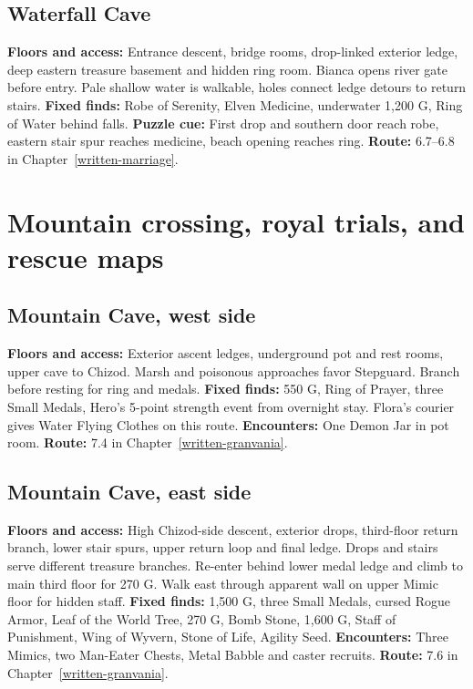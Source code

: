 \subsection{Waterfall Cave}
\label{atlas-waterfall}
\textbf{Floors and access:} Entrance descent, bridge rooms, drop-linked exterior ledge, deep eastern treasure basement and hidden ring room. Bianca opens river gate before entry. Pale shallow water is walkable, holes connect ledge detours to return stairs. \textbf{Fixed finds:} Robe of Serenity, Elven Medicine, underwater 1,200 G, Ring of Water behind falls. \textbf{Puzzle cue:} First drop and southern door reach robe, eastern stair spur reaches medicine, beach opening reaches ring. \textbf{Route:} 6.7--6.8 in Chapter~\ref{written-marriage}.

\section{Mountain crossing, royal trials, and rescue maps}
\subsection{Mountain Cave, west side}
\label{atlas-mountain-west}
\textbf{Floors and access:} Exterior ascent ledges, underground pot and rest rooms, upper cave to Chizod. Marsh and poisonous approaches favor Stepguard. Branch before resting for ring and medals. \textbf{Fixed finds:} 550 G, Ring of Prayer, three Small Medals, Hero's 5-point strength event from overnight stay. Flora's courier gives Water Flying Clothes on this route. \textbf{Encounters:} One Demon Jar in pot room. \textbf{Route:} 7.4 in Chapter~\ref{written-granvania}.

\subsection{Mountain Cave, east side}
\label{atlas-mountain-east}
\textbf{Floors and access:} High Chizod-side descent, exterior drops, third-floor return branch, lower stair spurs, upper return loop and final ledge. Drops and stairs serve different treasure branches. Re-enter behind lower medal ledge and climb to main third floor for 270 G. Walk east through apparent wall on upper Mimic floor for hidden staff. \textbf{Fixed finds:} 1,500 G, three Small Medals, cursed Rogue Armor, Leaf of the World Tree, 270 G, Bomb Stone, 1,600 G, Staff of Punishment, Wing of Wyvern, Stone of Life, Agility Seed. \textbf{Encounters:} Three Mimics, two Man-Eater Chests, Metal Babble and caster recruits. \textbf{Route:} 7.6 in Chapter~\ref{written-granvania}.

